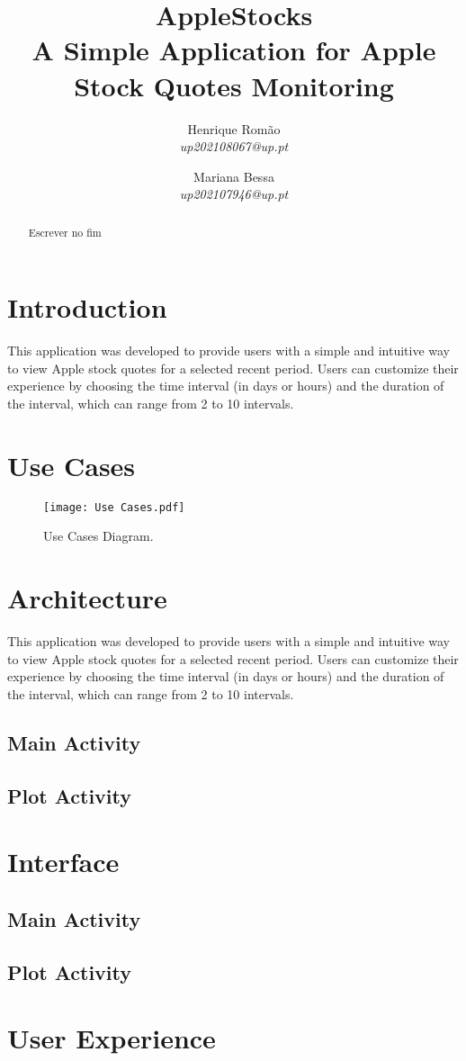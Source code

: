 \documentclass{article}
\title{\Huge \textbf{AppleStocks}\\\vspace{0.2em} \Large A Simple Application for Apple Stock Quotes Monitoring}
\author{
    Henrique Romão \\
    \textit{up202108067@up.pt}
    \and
    Mariana Bessa \\
    \textit{up202107946@up.pt}
}
\begin{document}
\maketitle

\begin{abstract}
    Escrever no fim
\end{abstract}

\section{Introduction}
This application was developed to provide users with a simple and intuitive way to view Apple stock quotes for a selected recent period. Users can customize their experience by choosing the time interval (in days or hours) and the duration of the interval, which can range from 2 to 10 intervals.

\section{Use Cases}

\begin{figure}
    \centering
    \texttt{[image: Use Cases.pdf]}
    \caption{Use Cases Diagram.}
    \label{fig:Use Cases}
\end{figure}

\section{Architecture}
This application was developed to provide users with a simple and intuitive way to view Apple stock quotes for a selected recent period. Users can customize their experience by choosing the time interval (in days or hours) and the duration of the interval, which can range from 2 to 10 intervals.

\subsection{Main Activity}

\subsection{Plot Activity}

\section{Interface}

\subsection{Main Activity}

\subsection{Plot Activity}


\section{User Experience}
\end{document}
